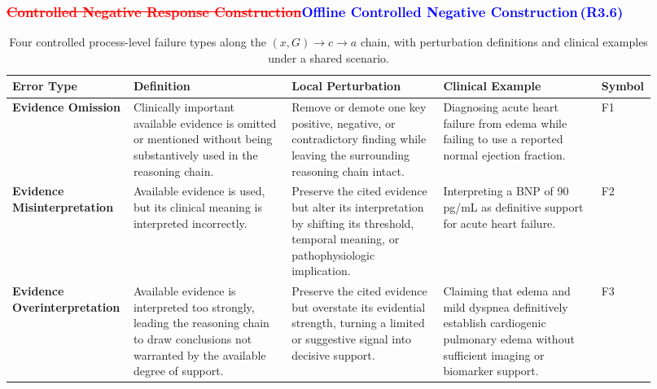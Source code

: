 \documentclass[a4paper,fleqn,doubleblind]{cas-sc}
\DeclareRobustCommand{\deleted}[1]{\textcolor{red}{\sout{#1}}}
\DeclareRobustCommand{\added}[1]{\textcolor{blue}{#1}}
\DeclareRobustCommand{\revtag}[1]{\textcolor{blue}{\scriptsize\,(\textbf{#1})}}
\begin{document}
\subsubsection{\deleted{Controlled Negative Response Construction}\added{Offline Controlled Negative Construction}\revtag{R3.6}}


\begin{table}[htbp]
    \centering
    \scriptsize
    \setlength{\tabcolsep}{4pt}
    \renewcommand{\arraystretch}{1.5}
    \caption{Four controlled process-level failure types along the $(x,G)\!\to\!c\!\to\!a$ chain, with perturbation definitions and clinical examples under a shared scenario.}
    \begin{tabular}{
        >{\raggedright\arraybackslash}p{0.15\linewidth}
        >{\raggedright\arraybackslash}p{0.24\linewidth}
        >{\raggedright\arraybackslash}p{0.23\linewidth}
        >{\raggedright\arraybackslash}p{0.24\linewidth}
        >{\centering\arraybackslash}p{0.06\linewidth}
    }
        \toprule
        \textbf{Error Type} & \textbf{Definition} & \textbf{Local Perturbation} & \textbf{Clinical Example} & \textbf{Symbol} \\
        \midrule

        \textbf{Evidence Omission} &
        Clinically important available evidence is omitted or mentioned without being substantively used in the reasoning chain. &
        Remove or demote one key positive, negative, or contradictory finding while leaving the surrounding reasoning chain intact. &
        Diagnosing acute heart failure from edema while failing to use a reported normal ejection fraction. &
        F1 \\

        \textbf{Evidence Misinterpretation} &
        Available evidence is used, but its clinical meaning is interpreted incorrectly. &
        Preserve the cited evidence but alter its interpretation by shifting its threshold, temporal meaning, or pathophysiologic implication. &
        Interpreting a BNP of 90 pg/mL as definitive support for acute heart failure. &
        F2 \\

        \textbf{Evidence Overinterpretation} &
        Available evidence is interpreted too strongly, leading the reasoning chain to draw conclusions not warranted by the available degree of support. &
        Preserve the cited evidence but overstate its evidential strength, turning a limited or suggestive signal into decisive support. &
        Claiming that edema and mild dyspnea definitively establish cardiogenic pulmonary edema without sufficient imaging or biomarker support. &
        F3 \\


\end{tabular}
\end{table}
\end{document}
